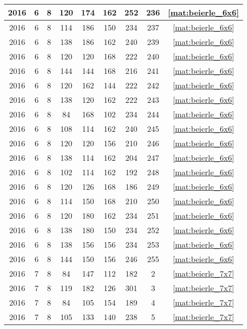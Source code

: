 \begin{longtable}{|c|c|c|c|c|c|c|c|c|}
2016 & 6 & 8 & 120 & 174 & 162 & 252 & 236 & \eqref{mat:beierle_6x6} \\ \hline 
2016 & 6 & 8 & 114 & 186 & 150 & 234 & 237 & \eqref{mat:beierle_6x6} \\ \hline 
2016 & 6 & 8 & 138 & 186 & 162 & 240 & 239 & \eqref{mat:beierle_6x6} \\ \hline 
2016 & 6 & 8 & 120 & 120 & 168 & 222 & 240 & \eqref{mat:beierle_6x6} \\ \hline 
2016 & 6 & 8 & 144 & 144 & 168 & 216 & 241 & \eqref{mat:beierle_6x6} \\ \hline 
2016 & 6 & 8 & 120 & 162 & 144 & 222 & 242 & \eqref{mat:beierle_6x6} \\ \hline 
2016 & 6 & 8 & 138 & 120 & 162 & 222 & 243 & \eqref{mat:beierle_6x6} \\ \hline 
2016 & 6 & 8 & 84 & 168 & 102 & 234 & 244 & \eqref{mat:beierle_6x6} \\ \hline 
2016 & 6 & 8 & 108 & 114 & 162 & 240 & 245 & \eqref{mat:beierle_6x6} \\ \hline 
2016 & 6 & 8 & 120 & 120 & 156 & 210 & 246 & \eqref{mat:beierle_6x6} \\ \hline 
2016 & 6 & 8 & 138 & 114 & 162 & 204 & 247 & \eqref{mat:beierle_6x6} \\ \hline 
2016 & 6 & 8 & 102 & 114 & 162 & 192 & 248 & \eqref{mat:beierle_6x6} \\ \hline 
2016 & 6 & 8 & 120 & 126 & 168 & 186 & 249 & \eqref{mat:beierle_6x6} \\ \hline 
2016 & 6 & 8 & 114 & 150 & 168 & 210 & 250 & \eqref{mat:beierle_6x6} \\ \hline 
2016 & 6 & 8 & 120 & 180 & 162 & 234 & 251 & \eqref{mat:beierle_6x6} \\ \hline 
2016 & 6 & 8 & 138 & 180 & 150 & 234 & 252 & \eqref{mat:beierle_6x6} \\ \hline 
2016 & 6 & 8 & 138 & 156 & 156 & 234 & 253 & \eqref{mat:beierle_6x6} \\ \hline 
2016 & 6 & 8 & 144 & 150 & 156 & 246 & 255 & \eqref{mat:beierle_6x6} \\ \hline 
2016 & 7 & 8 & 84 & 147 & 112 & 182 & 2 & \eqref{mat:beierle_7x7} \\ \hline 
2016 & 7 & 8 & 119 & 182 & 126 & 301 & 3 & \eqref{mat:beierle_7x7} \\ \hline 
2016 & 7 & 8 & 84 & 105 & 154 & 189 & 4 & \eqref{mat:beierle_7x7} \\ \hline 
2016 & 7 & 8 & 105 & 133 & 140 & 238 & 5 & \eqref{mat:beierle_7x7} \\ \hline 

\end{longtable}

